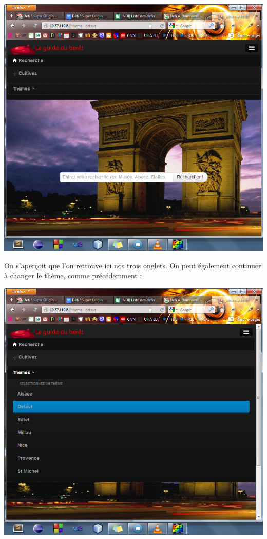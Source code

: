 \documentclass[12pt, a4paper]{article}
\newcommand{\espace}{\vspace{.8cm}}
\begin{document}
\espace{}
\begin{center}
\includegraphics[width=.9\textwidth, keepaspectratio=true]{img/accueil5.png}
\end{center}
\espace{}

On s'aperçoit que l'on retrouve ici nos trois onglets. On peut également continuer à changer le thème, comme précédemment : 

\espace{}
\begin{center}
\includegraphics[width=.9\textwidth, keepaspectratio=true]{img/accueil6.png}
\end{center}
\espace{}
\end{document}
